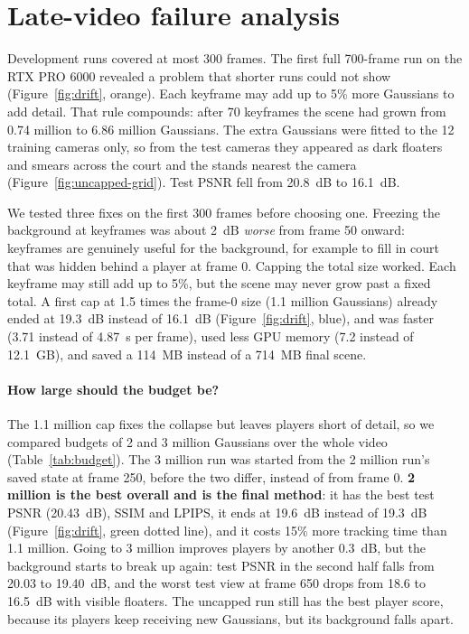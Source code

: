 \documentclass[11pt]{article}
\begin{document}
\FloatBarrier

\section{Late-video failure analysis}\label{app:failure}
Development runs covered at most 300 frames. The first full 700-frame run on the RTX PRO 6000
revealed a problem that shorter runs could not show (Figure~\ref{fig:drift}, orange). Each keyframe
may add up to 5\% more Gaussians to add detail. That rule compounds: after 70 keyframes the scene had
grown from 0.74 million to 6.86 million Gaussians. The extra Gaussians were fitted to the 12 training
cameras only, so from the test cameras they appeared as dark floaters and smears across the court and
the stands nearest the camera (Figure~\ref{fig:uncapped-grid}). Test PSNR fell from 20.8~dB to 16.1~dB.

We tested three fixes on the first 300 frames before choosing one. Freezing the background at
keyframes was about 2~dB \emph{worse} from frame 50 onward: keyframes are genuinely useful for the
background, for example to fill in court that was hidden behind a player at frame 0. Capping the
total size worked. Each keyframe may still add up to 5\%, but the scene may never grow past a fixed
total. A first cap at 1.5 times the frame-0 size (1.1 million Gaussians) already ended at 19.3~dB
instead of 16.1~dB (Figure~\ref{fig:drift}, blue), and was faster (3.71 instead of 4.87~s per frame),
used less GPU memory (7.2 instead of 12.1~GB), and saved a 114~MB instead of a 714~MB final scene.

\paragraph{How large should the budget be?} The 1.1 million cap fixes the collapse but leaves
players short of detail, so we compared budgets of 2 and 3 million Gaussians over the whole video
(Table~\ref{tab:budget}). The 3 million run was started from the 2 million run's saved state at
frame 250, before the two differ, instead of from frame 0. \textbf{2 million is the best overall
and is the final method}: it has the best test PSNR (20.43~dB), SSIM and LPIPS, it ends at 19.6~dB
instead of 19.3~dB (Figure~\ref{fig:drift}, green dotted line), and it costs 15\% more tracking
time than 1.1 million. Going to 3 million improves players by another 0.3~dB, but the background
starts to break up again: test PSNR in the second half falls from 20.03 to 19.40~dB, and the worst
test view at frame 650 drops from 18.6 to 16.5~dB with visible floaters. The uncapped run still has
the best player score, because its players keep receiving new Gaussians, but its background falls
apart.
\end{document}
